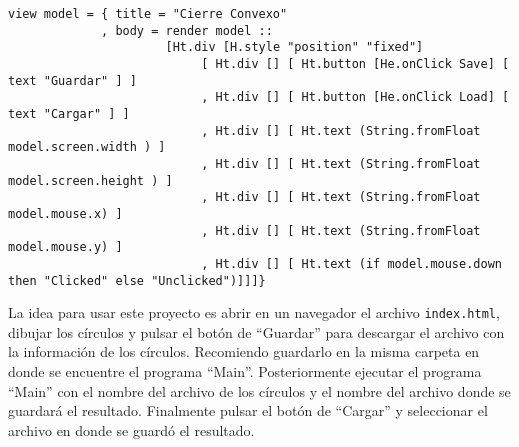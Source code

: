 \documentclass[12pt]{article}
\begin{document}
\begin{itemize}
  \begin{verbatim}
view model = { title = "Cierre Convexo"
             , body = render model ::
                      [Ht.div [H.style "position" "fixed"]
                           [ Ht.div [] [ Ht.button [He.onClick Save] [ text "Guardar" ] ]
                           , Ht.div [] [ Ht.button [He.onClick Load] [ text "Cargar" ] ]
                           , Ht.div [] [ Ht.text (String.fromFloat model.screen.width ) ]
                           , Ht.div [] [ Ht.text (String.fromFloat model.screen.height ) ]
                           , Ht.div [] [ Ht.text (String.fromFloat model.mouse.x) ]
                           , Ht.div [] [ Ht.text (String.fromFloat model.mouse.y) ]
                           , Ht.div [] [ Ht.text (if model.mouse.down then "Clicked" else "Unclicked")]]]}
  \end{verbatim}
  
\end{itemize}

La idea para usar este proyecto es abrir en un navegador el archivo \texttt{index.html}, dibujar los círculos y pulsar el botón de ``Guardar'' para descargar el archivo con la información de los círculos. Recomiendo guardarlo en la misma carpeta en donde se encuentre el programa ``Main''. Posteriormente ejecutar el programa ``Main'' con el nombre del archivo de los círculos y el nombre del archivo donde se guardará el resultado. Finalmente pulsar el botón de ``Cargar'' y seleccionar el archivo en donde se guardó el resultado.
\end{document}
